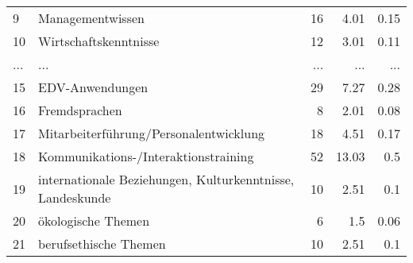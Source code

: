 \begin{longtable}{lXrrr}
        9 & \multicolumn{1}{X}{Managementwissen} & %
          \num{16} &
          \num[round-mode=places,round-precision=2]{4,01} &
          \num[round-mode=places,round-precision=2]{0,15} \\
        10 & \multicolumn{1}{X}{Wirtschaftskenntnisse} & %
          \num{12} &
          \num[round-mode=places,round-precision=2]{3,01} &
          \num[round-mode=places,round-precision=2]{0,11} \\
       ... & ... & ... & ... & ... \\
        15 & \multicolumn{1}{X}{EDV-Anwendungen} & %
          \num{29} &
          \num[round-mode=places,round-precision=2]{7,27} &
          \num[round-mode=places,round-precision=2]{0,28} \\

        16 & \multicolumn{1}{X}{Fremdsprachen} & %
          \num{8} &
          \num[round-mode=places,round-precision=2]{2,01} &
          \num[round-mode=places,round-precision=2]{0,08} \\

        17 & \multicolumn{1}{X}{Mitarbeiterführung/Personalentwicklung} & %
          \num{18} &
          \num[round-mode=places,round-precision=2]{4,51} &
          \num[round-mode=places,round-precision=2]{0,17} \\

        18 & \multicolumn{1}{X}{Kommunikations-/Interaktionstraining} & %
          \num{52} &
          \num[round-mode=places,round-precision=2]{13,03} &
          \num[round-mode=places,round-precision=2]{0,5} \\

        19 & \multicolumn{1}{X}{internationale Beziehungen, Kulturkenntnisse, Landeskunde} & %
          \num{10} &
          \num[round-mode=places,round-precision=2]{2,51} &
          \num[round-mode=places,round-precision=2]{0,1} \\

        20 & \multicolumn{1}{X}{ökologische Themen} & %
          \num{6} &
          \num[round-mode=places,round-precision=2]{1,5} &
          \num[round-mode=places,round-precision=2]{0,06} \\

        21 & \multicolumn{1}{X}{berufsethische Themen} & %
          \num{10} &
          \num[round-mode=places,round-precision=2]{2,51} &
          \num[round-mode=places,round-precision=2]{0,1} \\


\end{longtable}
